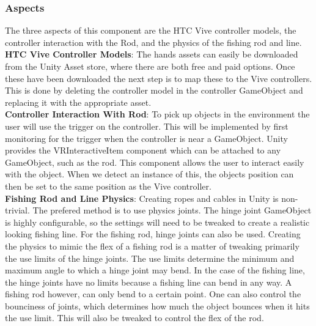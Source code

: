 \documentclass[10pt,journal,compsoc,onecolumn, draftclsnofoot]{IEEEtran}
\begin{document}
\subsubsection{Aspects}
The three aspects of this component are the HTC Vive controller models, the controller interaction with the Rod, and the physics of the fishing rod and line.\\

\hangindent=0.5cm \textbf{HTC Vive Controller Models}: The hands assets can easily be downloaded from the Unity Asset store, where there are both free and paid options.
Once these have been downloaded the next step is to map these to the Vive controllers.
This is done by deleting the controller model in the controller GameObject and replacing it with the appropriate asset.\\

\hangindent=0.5cm \textbf{Controller Interaction With Rod}: To pick up objects in the environment the user will use the trigger on the controller.
This will be implemented by first monitoring for the trigger when the controller is near a GameObject.
Unity provides the VRInteractiveItem component which can be attached to any GameObject, such as the rod.\cite{unity_controller_interaction}
This component allows the user to interact easily with the object.
When we detect an instance of this, the objects position can then be set to the same position as the Vive controller.\\

\hangindent=0.5cm \textbf{Fishing Rod and Line Physics}: Creating ropes and cables in Unity is non-trivial.
The prefered method is to use physics joints.
The hinge joint GameObject is highly configurable, so the settings will need to be tweaked to create a realistic looking fishing line.
For the fishing rod, hinge joints can also be used.
Creating the physics to mimic the flex of a fishing rod is a matter of tweaking primarily the use limits of the hinge joints.
The use limits determine the minimum and maximum angle to which a hinge joint may bend.\cite{unity_physics_joints}
In the case of the fishing line, the hinge joints have no limits because a fishing line can bend in any way.
A fishing rod however, can only bend to a certain point.
One can also control the bounciness of joints, which determines how much the object bounces when it hits the use limit.
This will also be tweaked to control the flex of the rod.



\end{document}
